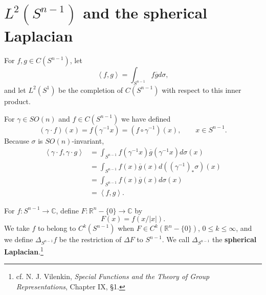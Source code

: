 \documentclass{article}
\newcommand{\inner}[2]{\left\langle #1, #2 \right\rangle}
\theoremstyle{definition}
\begin{document}
\section{$L^2(S^{n-1})$ and the spherical Laplacian}
For $f,g \in C(S^{n-1})$, let
\[
\inner{f}{g}= \int_{S^{n-1}} f \overline{g} d\sigma,
\]
and let $L^2(S^1)$ be the completion of $C(S^{n-1})$ with respect to this inner product.

For $\gamma \in SO(n)$ and $f \in C(S^{n-1})$ we have defined
\[
(\gamma \cdot f)(x) = f(\gamma^{-1} x)=(f \circ \gamma^{-1})(x),\qquad x \in S^{n-1}.
\]
Because $\sigma$ is $SO(n)$-invariant,
\begin{align*}
\inner{\gamma \cdot f}{\gamma\cdot g}&=\int_{S^{n-1}} f(\gamma^{-1}x) \overline{g}(\gamma^{-1}x) d\sigma(x)\\
&=\int_{S^{n-1}} f(x) \overline{g}(x) d((\gamma^{-1})_* \sigma)(x)\\
&=\int_{S^{n-1}} f(x) \overline{g}(x) d\sigma(x)\\
&=\inner{f}{g}.
\end{align*}


For $f:S^{n-1} \to \mathbb{C}$, define $F:\mathbb{R}^n - \{0\} \to \mathbb{C}$ by
\[
F(x) = f(x/|x|).
\]
We take $f$ to belong to $C^k(S^{n-1})$ when $F \in C^k(\mathbb{R}^n - \{0\})$, $0 \leq k \leq \infty$, and
we define
$\Delta_{S^{n-1}} f$ be the restriction of $\Delta F$ to $S^{n-1}$.  We call $\Delta_{S^{n-1}}$ the \textbf{spherical
Laplacian}.\footnote{cf. N. J. Vilenkin, {\em Special Functions and the Theory of Group
Representations}, Chapter IX, \S 1.}
\end{document}
